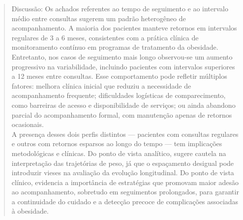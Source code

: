 \documentclass[
]{article}
\begin{document}
\begin{quote}
Discussão: Os achados referentes ao tempo de seguimento e ao intervalo
médio entre consultas sugerem um padrão heterogêneo de acompanhamento. A
maioria dos pacientes manteve retornos em intervalos regulares de 3 a 6
meses, consistentes com a prática clínica de monitoramento contínuo em
programas de tratamento da obesidade. Entretanto, nos casos de
seguimento mais longo observou-se um aumento progressivo na
variabilidade, incluindo pacientes com intervalos superiores a 12 meses
entre consultas. Esse comportamento pode refletir múltiplos fatores:
melhora clínica inicial que reduziu a necessidade de acompanhamento
frequente; dificuldades logísticas de comparecimento, como barreiras de
acesso e disponibilidade de serviços; ou ainda abandono parcial do
acompanhamento formal, com manutenção apenas de retornos ocasionais.\\
A presença desses dois perfis distintos --- pacientes com consultas
regulares e outros com retornos esparsos ao longo do tempo --- tem
implicações metodológicas e clínicas. Do ponto de vista analítico,
sugere cautela na interpretação das trajetórias de peso, já que o
espaçamento desigual pode introduzir vieses na avaliação da evolução
longitudinal. Do ponto de vista clínico, evidencia a importância de
estratégias que promovam maior adesão ao acompanhamento, sobretudo em
seguimentos prolongados, para garantir a continuidade do cuidado e a
detecção precoce de complicações associadas à obesidade.
\end{quote}
\end{document}
